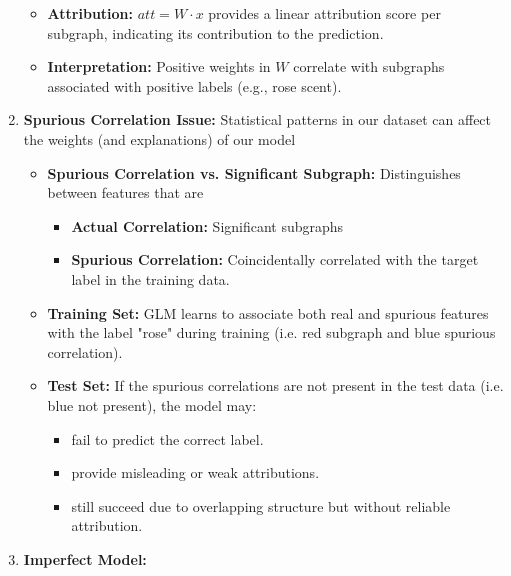 \begin{example}
\begin{enumerate}
\begin{itemize}
\begin{itemize}
            \end{itemize}
            \item \textbf{Attribution:} \( att = W \cdot x \) provides a linear attribution score per subgraph, indicating its contribution to the prediction.
            \item \textbf{Interpretation:} Positive weights in \( W \) correlate with subgraphs associated with positive labels (e.g., rose scent).
        \end{itemize}        
        \newpage
        \item \textbf{Spurious Correlation Issue:} Statistical patterns in our dataset can affect the weights (and explanations) of our model
        \begin{itemize}            
            \item \textbf{Spurious Correlation vs. Significant Subgraph:} Distinguishes between features that are 
            \begin{itemize}
                \item \textbf{Actual Correlation:} Significant subgraphs
                \item \textbf{Spurious Correlation:} Coincidentally correlated with the target label in the training data.
            \end{itemize}
        
            \item \textbf{Training Set:} GLM learns to associate both real and spurious features with the label "rose" during training (i.e. red subgraph and blue spurious correlation).
        
            \item \textbf{Test Set:} If the spurious correlations are not present in the test data (i.e. blue not present), the model may:
            \begin{itemize}
                \item fail to predict the correct label.
                \item provide misleading or weak attributions.
                \item still succeed due to overlapping structure but without reliable attribution.
            \end{itemize}
        \end{itemize}
        \item \textbf{Imperfect Model:}
    \end{enumerate}
\end{example}
\newpage

